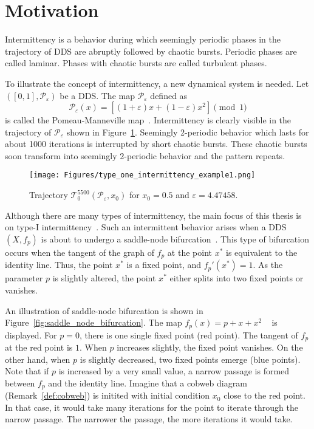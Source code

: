 \section{Motivation}
Intermittency is a behavior during which seemingly periodic phases in the trajectory of DDS are abruptly followed by chaotic bursts.
Periodic phases are called laminar.
Phases with chaotic bursts are called turbulent phases.
\par
To illustrate the concept of intermittency, a new dynamical system is needed.
Let $([0, 1], \mathcal{P}_{\varepsilon})$ be a DDS.
The map $\mathcal{P}_{\varepsilon}$ defined as 
\begin{equation}
    \mathcal{P}_{\varepsilon}(x) = \left[ (1+\varepsilon)x+(1-\varepsilon)x^2 \right] \pmod{1} \label{pommeau_manneville_map}
\end{equation}
is called the Pomeau-Manneville map~\cite{Manneville1980,Datseris2022}.
Intermittency is clearly visible in the trajectory of $\mathcal{P}_{\varepsilon}$ shown in Figure~\ref{fig:intermittent_trajectory_example}.
Seemingly 2-periodic behavior which lasts for about 1000 iterations is interrupted by short chaotic bursts.
These chaotic bursts soon transform into seemingly 2-periodic behavior and the pattern repeats.

\begin{figure}[!h]
    \centering
    \texttt{[image: Figures/type\_one\_intermittency\_example1.png]}
    \caption{
        Trajectory $\mathcal{T}^{5500}_{0}(\mathcal{P}_{\varepsilon}, x_0)$ for $x_0 = 0.5$ and $\varepsilon = 4.47458$.
    }
    \label{fig:intermittent_trajectory_example}
\end{figure}

Although there are many types of intermittency, the main focus of this thesis is on type-I intermittency~\cite{Pomeau1980,Bussac1982,DelRio2014}.
Such an intermittent behavior arises when a DDS $(X, f_{p})$ is about to undergo a saddle-node bifurcation~\cite{Elaskar2017}.
This type of bifurcation occurs when the tangent of the graph of $f_{p}$ at the point $x^{*}$ is equivalent to the identity line.
Thus, the point $x^{*}$ is a fixed point, and $f_{p}'(x^{*}) = 1$.
As the parameter $p$ is slightly altered, the point $x^{*}$ either splits into two fixed points or vanishes.
\par
An illustration of saddle-node bifurcation is shown in Figure~\ref{fig:saddle_node_bifurcation}.
The map $f_{p}(x) = p + x + x^2$ ~\cite{Pomeau1980} is displayed.
For $p = 0$, there is one single fixed point (red point).
The tangent of $f_{p}$ at the red point is $1$.
When $p$ increases slightly, the fixed point vanishes.
On the other hand, when $p$ is slightly decreased, two fixed points emerge (blue points).
Note that if $p$ is increased by a very small value, a narrow passage is formed between $f_{p}$ and the identity line.
Imagine that a cobweb diagram (Remark~\ref{def:cobweb}) is initited with initial condition $x_0$ close to the red point.
In that case, it would take many iterations for the point to iterate through the narrow passage.
The narrower the passage, the more iterations it would take.

